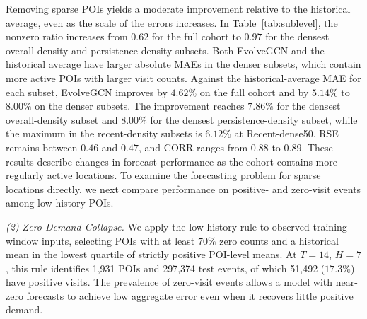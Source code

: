 \documentclass[preprint,authoryear,11pt]{elsarticle}
\theoremstyle{definition}
\begin{document}
Removing sparse POIs yields a moderate improvement relative to the historical average, even as the scale of the errors increases.
In Table~\ref{tab:sublevel}, the nonzero ratio increases from \(0.62\) for the full cohort to \(0.97\) for the densest overall-density and persistence-density subsets.
Both EvolveGCN and the historical average have larger absolute MAEs in the denser subsets, which contain more active POIs with larger visit counts.
Against the historical-average MAE for each subset, EvolveGCN improves by \(4.62\%\) on the full cohort and by \(5.14\%\) to \(8.00\%\) on the denser subsets.
The improvement reaches \(7.86\%\) for the densest overall-density subset and \(8.00\%\) for the densest persistence-density subset, while the maximum in the recent-density subsets is \(6.12\%\) at Recent-dense50.
RSE remains between \(0.46\) and \(0.47\), and CORR ranges from \(0.88\) to \(0.89\).
These results describe changes in forecast performance as the cohort contains more regularly active locations.
To examine the forecasting problem for sparse locations directly, we next compare performance on positive- and zero-visit events among low-history POIs.

\textit{(2) Zero-Demand Collapse.}
We apply the low-history rule to observed training-window inputs, selecting POIs with at least \(70\%\) zero counts and a historical mean in the lowest quartile of strictly positive POI-level means.
At \(T=14\), \(H=7\), this rule identifies 1,931 POIs and 297,374 test events, of which 51,492 (\(17.3\%\)) have positive visits.
The prevalence of zero-visit events allows a model with near-zero forecasts to achieve low aggregate error even when it recovers little positive demand.
\end{document}
